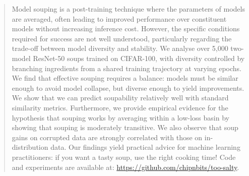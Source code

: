 \maketitle

\begin{abstract}
Model souping is a post-training technique where the parameters of models are averaged, often leading to improved performance over constituent models without increasing inference cost. However, the specific conditions required for success are not well understood, particularly regarding the trade-off between model diversity and stability. We analyse over 5,000 two-model ResNet-50 soups trained on CIFAR-100, with diversity controlled by branching ingredients from a shared training trajectory at varying epochs. We find that effective souping requires a balance: models must be similar enough to avoid model collapse, but diverse enough to yield improvements. We show that we can predict soupability relatively well with standard similarity metrics. Furthermore, we provide empirical evidence for the hypothesis that souping works by averaging within a low-loss basin by showing that souping is moderately transitive. We also observe that soup gains on corrupted data are strongly correlated with those on in-distribution data. Our findings yield practical advice for machine learning practitioners: if you want a tasty soup, use the right cooking time! Code and experiments are available at: \url{https://github.com/chipnbits/too-salty}.
\end{abstract}

